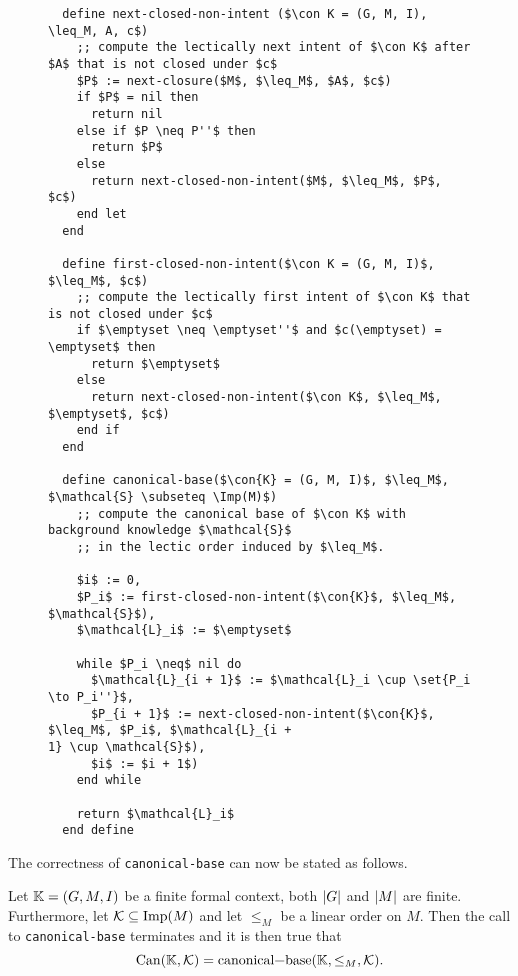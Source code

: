 \begin{figure}[tp]
  \begin{Algorithm}
    \label{alg:canonical-base}
    \hspace*{0cm}
\begin{lstlisting}
  define next-closed-non-intent ($\con K = (G, M, I), \leq_M, A, c$)
    ;; compute the lectically next intent of $\con K$ after $A$ that is not closed under $c$
    $P$ := next-closure($M$, $\leq_M$, $A$, $c$)
    if $P$ = nil then
      return nil
    else if $P \neq P''$ then
      return $P$
    else
      return next-closed-non-intent($M$, $\leq_M$, $P$, $c$)
    end let
  end

  define first-closed-non-intent($\con K = (G, M, I)$, $\leq_M$, $c$)
    ;; compute the lectically first intent of $\con K$ that is not closed under $c$
    if $\emptyset \neq \emptyset''$ and $c(\emptyset) = \emptyset$ then
      return $\emptyset$
    else
      return next-closed-non-intent($\con K$, $\leq_M$, $\emptyset$, $c$)
    end if
  end

  define canonical-base($\con{K} = (G, M, I)$, $\leq_M$, $\mathcal{S} \subseteq \Imp(M)$)
    ;; compute the canonical base of $\con K$ with background knowledge $\mathcal{S}$
    ;; in the lectic order induced by $\leq_M$.

    $i$ := 0,
    $P_i$ := first-closed-non-intent($\con{K}$, $\leq_M$, $\mathcal{S}$),
    $\mathcal{L}_i$ := $\emptyset$

    while $P_i \neq$ nil do
      $\mathcal{L}_{i + 1}$ := $\mathcal{L}_i \cup \set{P_i \to P_i''}$,
      $P_{i + 1}$ := next-closed-non-intent($\con{K}$, $\leq_M$, $P_i$, $\mathcal{L}_{i +
1} \cup \mathcal{S}$),
      $i$ := $i + 1$)
    end while

    return $\mathcal{L}_i$
  end define
\end{lstlisting}
  \end{Algorithm}
\end{figure}

The correctness of \lstinline{canonical-base} can now be stated as follows.

\begin{Theorem}
  \label{thm:canonical-base-computation}
  Let ${\mathbb{K}} = (G, M, I)$ be a finite formal context, \ie both $\lvert G\rvert$ and $\lvert M\rvert$ are
  finite.  Furthermore, let $\mathcal{K} \subseteq \operatorname{Imp}(M)$ and let $\leq_M$ be a linear
  order on $M$.  Then the call to \lstinline{canonical-base} terminates and it is then
  true that
  \begin{equation*}
    \Can(\con K, \mathcal{K}) = \text{\lstinline{canonical-base}}(\con K, \leq_M, \mathcal{K}).
  \end{equation*}
\end{Theorem}

